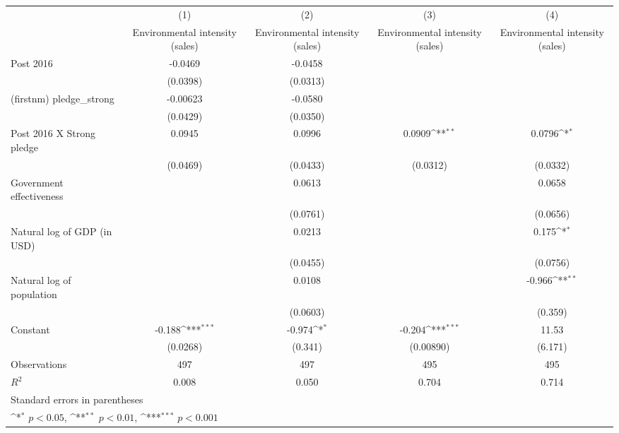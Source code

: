{
\def\sym#1{\ifmmode^{#1}\else\(^{#1}\)\fi}
\begin{tabular}{l*{4}{c}}
\hline\hline
                    &\multicolumn{1}{c}{(1)}&\multicolumn{1}{c}{(2)}&\multicolumn{1}{c}{(3)}&\multicolumn{1}{c}{(4)}\\
                    &\multicolumn{1}{c}{Environmental intensity (sales)}&\multicolumn{1}{c}{Environmental intensity (sales)}&\multicolumn{1}{c}{Environmental intensity (sales)}&\multicolumn{1}{c}{Environmental intensity (sales)}\\
\hline
Post 2016           &     -0.0469         &     -0.0458         &                     &                     \\
                    &    (0.0398)         &    (0.0313)         &                     &                     \\
[1em]
(firstnm) pledge\_strong&    -0.00623         &     -0.0580         &                     &                     \\
                    &    (0.0429)         &    (0.0350)         &                     &                     \\
[1em]
Post 2016 X Strong pledge&      0.0945         &      0.0996         &      0.0909\sym{**} &      0.0796\sym{*}  \\
                    &    (0.0469)         &    (0.0433)         &    (0.0312)         &    (0.0332)         \\
[1em]
Government effectiveness&                     &      0.0613         &                     &      0.0658         \\
                    &                     &    (0.0761)         &                     &    (0.0656)         \\
[1em]
Natural log of GDP (in USD)&                     &      0.0213         &                     &       0.175\sym{*}  \\
                    &                     &    (0.0455)         &                     &    (0.0756)         \\
[1em]
Natural log of population&                     &      0.0108         &                     &      -0.966\sym{**} \\
                    &                     &    (0.0603)         &                     &     (0.359)         \\
[1em]
Constant            &      -0.188\sym{***}&      -0.974\sym{*}  &      -0.204\sym{***}&       11.53         \\
                    &    (0.0268)         &     (0.341)         &   (0.00890)         &     (6.171)         \\
\hline
Observations        &         497         &         497         &         495         &         495         \\
\(R^{2}\)           &       0.008         &       0.050         &       0.704         &       0.714         \\
\hline\hline
\multicolumn{5}{l}{\footnotesize Standard errors in parentheses}\\
\multicolumn{5}{l}{\footnotesize \sym{*} \(p<0.05\), \sym{**} \(p<0.01\), \sym{***} \(p<0.001\)}\\
\end{tabular}
}
